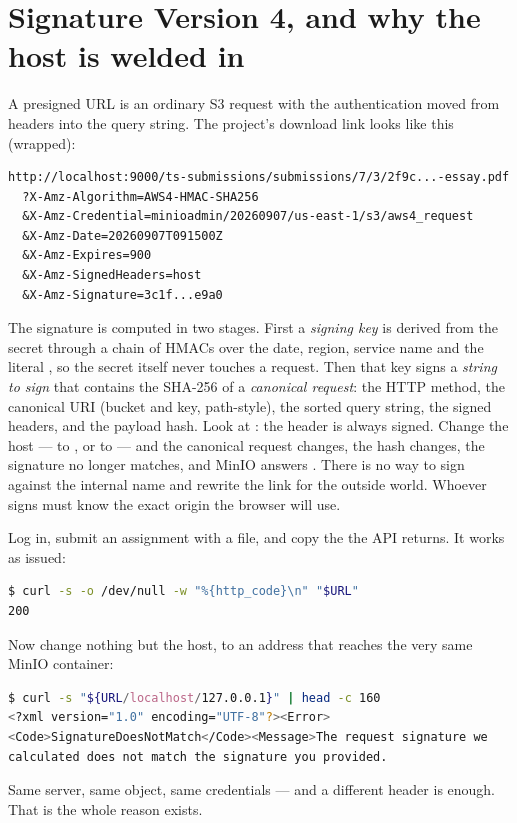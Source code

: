 \section{Signature Version 4, and why the host is welded in}
\label{sec:sigv4}

A presigned URL is an ordinary S3 request with the authentication moved
from headers into the query string. The project's download link looks
like this (wrapped):

\begin{lstlisting}
http://localhost:9000/ts-submissions/submissions/7/3/2f9c...-essay.pdf
  ?X-Amz-Algorithm=AWS4-HMAC-SHA256
  &X-Amz-Credential=minioadmin/20260907/us-east-1/s3/aws4_request
  &X-Amz-Date=20260907T091500Z
  &X-Amz-Expires=900
  &X-Amz-SignedHeaders=host
  &X-Amz-Signature=3c1f...e9a0
\end{lstlisting}

The signature is computed in two stages. First a \emph{signing key} is
derived from the secret through a chain of HMACs over the date, region,
service name and the literal , so the secret itself
never touches a request. Then that key signs a \emph{string to sign}
that contains the SHA-256 of a \emph{canonical request}: the HTTP
method, the canonical URI (bucket and key, path-style), the sorted query
string, the signed headers, and the payload hash. Look at
: the  header is always
signed. Change the host ---  to , or
 to  --- and the canonical request
changes, the hash changes, the signature no longer matches, and MinIO
answers . There is no way to sign against
the internal name and rewrite the link for the outside world. Whoever
signs must know the exact origin the browser will use.

\begin{handson}
Log in, submit an assignment with a file, and copy the
 the API returns. It works as issued:
\begin{lstlisting}[language=bash]
$ curl -s -o /dev/null -w "%{http_code}\n" "$URL"
200
\end{lstlisting}
Now change nothing but the host, to an address that reaches the very
same MinIO container:
\begin{lstlisting}[language=bash]
$ curl -s "${URL/localhost/127.0.0.1}" | head -c 160
<?xml version="1.0" encoding="UTF-8"?><Error>
<Code>SignatureDoesNotMatch</Code><Message>The request signature we
calculated does not match the signature you provided.
\end{lstlisting}
Same server, same object, same credentials --- and a different
 header is enough. That is the whole reason
 exists.
\end{handson}

